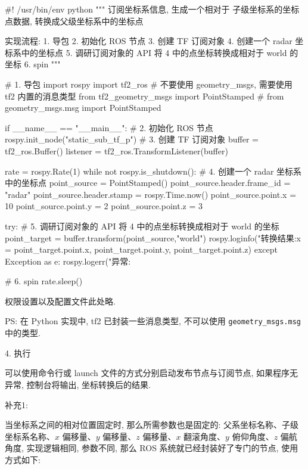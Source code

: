 \documentclass[openany, fontset=windowsold]{ctexbook}
\theoremstyle{kaiti}
\theoremstyle{normal}
\begin{document}
\begin{python}
  #! /usr/bin/env python
  """  
      订阅坐标系信息, 生成一个相对于 子级坐标系的坐标点数据, 
      转换成父级坐标系中的坐标点

      实现流程:
          1. 导包
          2. 初始化 ROS 节点
          3. 创建 TF 订阅对象
          4. 创建一个 radar 坐标系中的坐标点
          5. 调研订阅对象的 API 将 4 中的点坐标转换成相对于 world 的坐标
          6. spin
  """

  # 1. 导包
  import rospy
  import tf2_ros
  # 不要使用 geometry_msgs, 需要使用 tf2 内置的消息类型
  from tf2_geometry_msgs import PointStamped
  # from geometry_msgs.msg import PointStamped

  if __name__ == "__main__":
      # 2. 初始化 ROS 节点
      rospy.init_node("static_sub_tf_p")
      # 3. 创建 TF 订阅对象
      buffer = tf2_ros.Buffer()
      listener = tf2_ros.TransformListener(buffer)

      rate = rospy.Rate(1)
      while not rospy.is_shutdown():    
      # 4. 创建一个 radar 坐标系中的坐标点
          point_source = PointStamped()
          point_source.header.frame_id = "radar"
          point_source.header.stamp = rospy.Time.now()
          point_source.point.x = 10
          point_source.point.y = 2
          point_source.point.z = 3

          try:
      #     5. 调研订阅对象的 API 将 4 中的点坐标转换成相对于 world 的坐标
              point_target = buffer.transform(point_source,"world")
              rospy.loginfo("转换结果:x = %
                              point_target.point.x,
                              point_target.point.y,
                              point_target.point.z)
          except Exception as e:
              rospy.logerr("异常:%

      #     6. spin
          rate.sleep()
\end{python}

权限设置以及配置文件此处略.

PS: 在 Python 实现中, tf2 已封装一些消息类型, 不可以使用 \verb|geometry_msgs.msg| 中的类型.

4. 执行

可以使用命令行或 launch 文件的方式分别启动发布节点与订阅节点, 如果程序无异常, 控制台将输出, 坐标转换后的结果.

补充1:

当坐标系之间的相对位置固定时, 那么所需参数也是固定的: 父系坐标名称、子级坐标系名称、$x$ 偏移量、$y$ 偏移量、$z$ 偏移量、$x$ 翻滚角度、$y$ 俯仰角度、$z$ 偏航角度, 实现逻辑相同, 参数不同, 那么 ROS 系统就已经封装好了专门的节点, 使用方式如下:
\end{document}
